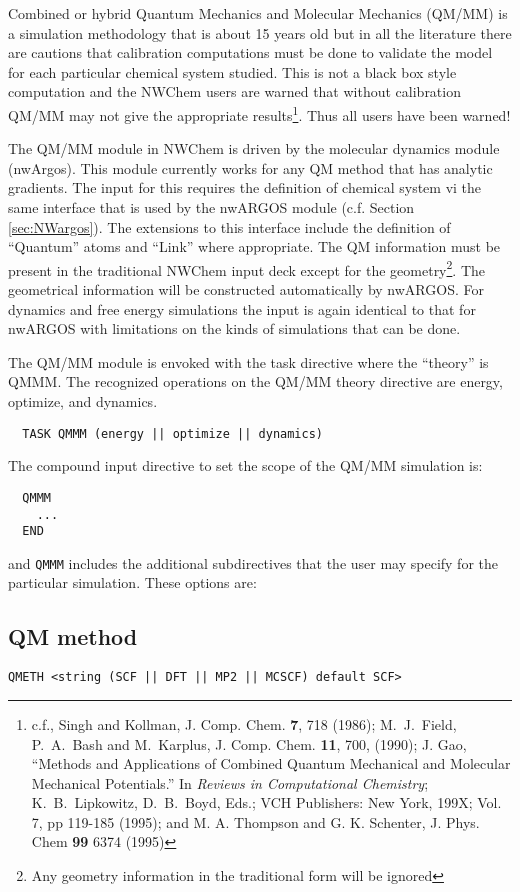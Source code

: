 
\label{sec:qmmm}

Combined or hybrid Quantum Mechanics and Molecular Mechanics (QM/MM)
is a simulation methodology that is about 15 years old but in all the
literature there are cautions that calibration computations must be
done to validate the model for each particular chemical system
studied.  This is not a black box style computation and the NWChem
users are warned that without calibration QM/MM may not give the
appropriate results\footnote{c.f., Singh and Kollman, J. Comp. Chem.
  {\bf 7}, 718 (1986); M.~J.~Field, P.~A.~Bash and M.~Karplus, J.
  Comp. Chem. {\bf 11}, 700, (1990); J. Gao, ``Methods and
  Applications of Combined Quantum Mechanical and Molecular Mechanical
  Potentials.'' In {\it Reviews in Computational Chemistry};
  K.~B.~Lipkowitz, D.~B.~Boyd, Eds.; VCH Publishers: New York, 199X;
  Vol. 7, pp 119-185 (1995); and M. A. Thompson and G. K. Schenter, J.
  Phys. Chem {\bf 99} 6374 (1995) }.  Thus all users have been warned!

The QM/MM module in NWChem is driven by the molecular dynamics module
(nwArgos).  This module currently works for any QM method that has
analytic gradients.  The input for this requires the definition of
chemical system vi the same interface that is used by the nwARGOS
module (c.f. Section \ref{sec:NWargos}).  The extensions to this
interface include the definition of ``Quantum'' atoms and ``Link''
where appropriate.  The QM information must be present in the
traditional NWChem input deck except for the geometry\footnote{Any
  geometry information in the traditional form will be ignored}.  The
geometrical information will be constructed automatically by nwARGOS.
For dynamics and free energy simulations the input is again identical
to that for nwARGOS with limitations on the kinds of simulations that
can be done.

The QM/MM module is envoked with the task directive where the
``theory'' is QMMM.  The recognized operations on the QM/MM theory
directive are energy, optimize, and dynamics.

\begin{verbatim}
  TASK QMMM (energy || optimize || dynamics)
\end{verbatim}

The compound input directive to set the scope of the QM/MM simulation
is: 
\begin{verbatim}
  QMMM
    ...
  END
\end{verbatim}

and \verb+QMMM+ includes the additional subdirectives that the user
may specify for the particular simulation.  These options are:

\subsection{QM method}
\begin{verbatim}
QMETH <string (SCF || DFT || MP2 || MCSCF) default SCF>
\end{verbatim}




